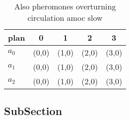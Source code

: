 \documentclass[a4paper]{article}
\begin{document}
\begin{table}
\begin{adjustbox}{width=0.6\columnwidth}
\begin{tabular}{|l|l|l|l|l|}
\hline
\textbf{plan} & \multicolumn{1}{c|}{\textbf{0}} & \multicolumn{1}{c|}{\textbf{1}} & \multicolumn{1}{c|}{\textbf{2}} & \multicolumn{1}{c|}{\textbf{3}} \\ \hline
\textbf{$a_0$}  & (0,0) & (1,0) & (2,0) & (3,0) \\ \hline
\textbf{$a_1$}  & (0,0) & (1,0) & (2,0) & (3,0) \\ \hline
\textbf{$a_2$}  & (0,0) & (1,0) & (2,0) & (3,0) \\ \hline
\end{tabular}
\end{adjustbox}
\caption{Also pheromones overturning circulation amoc slow
}
\end{table}

\subsection{SubSection}
\end{document}

